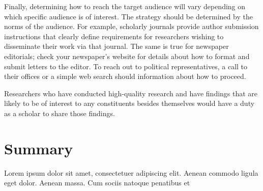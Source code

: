 Finally, determining how to reach the target audience will vary depending on which specific audience is of interest. The strategy should be determined by the norms of the audience. For example, scholarly journals provide author submission instructions that clearly define requirements for researchers wishing to disseminate their work via that journal. The same is true for newspaper editorials; check your newspaper's website for details about how to format and submit letters to the editor. To reach out to political representatives, a call to their offices or a simple web search should information about how to proceed.

Researchers who have conducted high-quality research and have findings that are likely to be of interest to any constituents besides themselves would have a duty as a scholar to share those findings. 

\section{Summary}\label{ch15:summary}

Lorem ipsum dolor sit amet, consectetuer adipiscing elit. Aenean commodo ligula eget dolor. Aenean massa. Cum sociis natoque penatibus et
